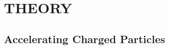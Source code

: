 \documentclass[a4paper,oneside,12pt]{report}
\numberwithin{equation}{chapter}
\begin{document}


\tableofcontents


\newcommand{\vecthreeBF}[1]{\vec{\textbf{#1}}}
\newcommand{\vecthree}[1]{\vec{#1}}

\newcommand{\parDeriv}[2]{\frac{\partial #1}{\partial #2}}
\newcommand{\parDerivS}[2]{\frac{\partial^2 #1}{\partial #2^2}}
\newcommand{\derivS}[2]{\frac{d^2 #1}{d#2^2}}

\newcommand{\dotProdBF}[2]{\vecthreeBF{#1} \cdot \vecthreeBF{#2}}
\newcommand{\dotProd}[2]{\vecthree{#1} \cdot \vecthree{#2}}

\newcommand{\crossProdBF}[2]{\vecthreeBF{#1} \times \vecthreeBF{#2}}
\newcommand{\crossProd}[2]{\vecthree{#1} \times \vecthree{#2}}


\newcommand{\fromeq}[1]{\textit{equation \ref{eq:#1}}}
\newcommand{\fromeqs}[2]{\textit{equations \ref{eq:#1} and \ref{eq:#2}}}
\newcommand{\fromeqsth}[3]{\textit{equations \ref{eq:#1}, \ref{eq:#2} and \ref{eq:#3}}}

\newcommand{\fromfig}[1]{\textit{figure \ref{fig:#1}}}
\newcommand{\fromfigs}[2]{\textit{figures \ref{fig:#1} and \ref{fig:#2}}}

\newcommand{\fromsec}[1]{\textit{section \ref{sec:#1}}}
\newcommand{\fromsecs}[2]{\textit{sections \ref{sec:#1} and \ref{sec:#2}}}

\newcommand{\fromapp}[1]{\textit{Appendix \ref{appendix:#1}}}%

\chapter{THEORY}

\section{Accelerating Charged Particles}
\end{document}
